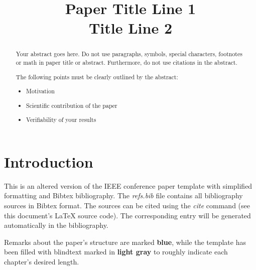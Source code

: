 \documentclass[conference]{IEEEtran}
\begin{document}

\title{ Paper Title Line 1\\ Title Line 2 }

\author{
}

\maketitle

\begin{abstract}
Your abstract goes here. Do not use paragraphs, symbols, special characters, footnotes or math in paper title or abstract. Furthermore, do not use citations in the abstract.

\vspace{\baselineskip}
\color{structure}The following points must be clearly outlined by the abstract:
\begin{itemize}
    \item Motivation
    \item Scientific contribution of the paper
    \item Verifiability of your results
\end{itemize}\color{black}

\color{blindtext}\blindtext\color{black}

\end{abstract}

\section{Introduction}

This is an altered version of the IEEE conference paper template with simplified formatting and Bibtex bibliography. The \textit{refs.bib} file contains all bibliography sources in Bibtex format. The sources can be cited using the \textit{cite} command \cite{Bishop2006Pattern} (see this document's LaTeX source code). The corresponding entry will be generated automatically in the bibliography.

\vspace{\baselineskip}
Remarks about the paper's structure are marked \color{structure}\textbf{blue}\color{black}, while the template has been filled with blindtext marked in \color{blindtext}\textbf{light gray}\color{black} to roughly indicate each chapter's desired length.
\end{document}
